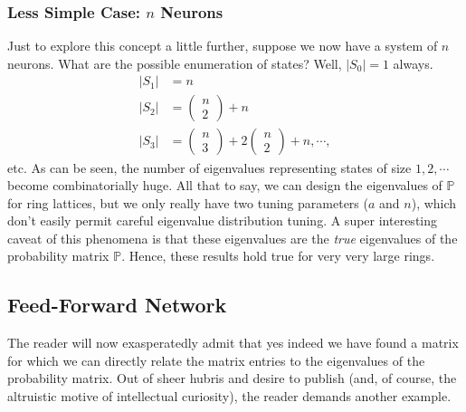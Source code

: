 \documentclass[superscriptaddress]{revtex4-1}
\newcommand{\prob}{\mathbb{P}}
\begin{document}
\subsubsection{Less Simple Case: $n$ Neurons}
Just to explore this concept a little further, suppose we now have a system of $n$ neurons. What are the possible enumeration of states? Well, $|S_0| = 1$ always.
\begin{align*}
|S_1| &= n\\
|S_2| &= 
\begin{pmatrix}
n\\2
\end{pmatrix}
+ n\\
|S_3| &= 
\begin{pmatrix}
n\\3
\end{pmatrix}
+
2\begin{pmatrix}
n\\2
\end{pmatrix}
+ n,\dotsm,
\end{align*}
etc. As can be seen, the number of eigenvalues representing states of size $1, 2, \dotsm$ become combinatorially huge. All that to say, we can design the eigenvalues of $\prob$ for ring lattices, but we only really have two tuning parameters ($a$ and $n$), which don't easily permit careful eigenvalue distribution tuning. A super interesting caveat of this phenomena is that these eigenvalues are the \emph{true} eigenvalues of the probability matrix $\prob$. Hence, these results hold true for very very large rings. 





\subsection{Feed-Forward Network}
The reader will now exasperatedly admit that yes indeed we have found a matrix for which we can directly relate the matrix entries to the eigenvalues of the probability matrix. Out of sheer hubris and desire to publish (and, of course, the altruistic motive of intellectual curiosity), the reader demands another example.
\end{document}
